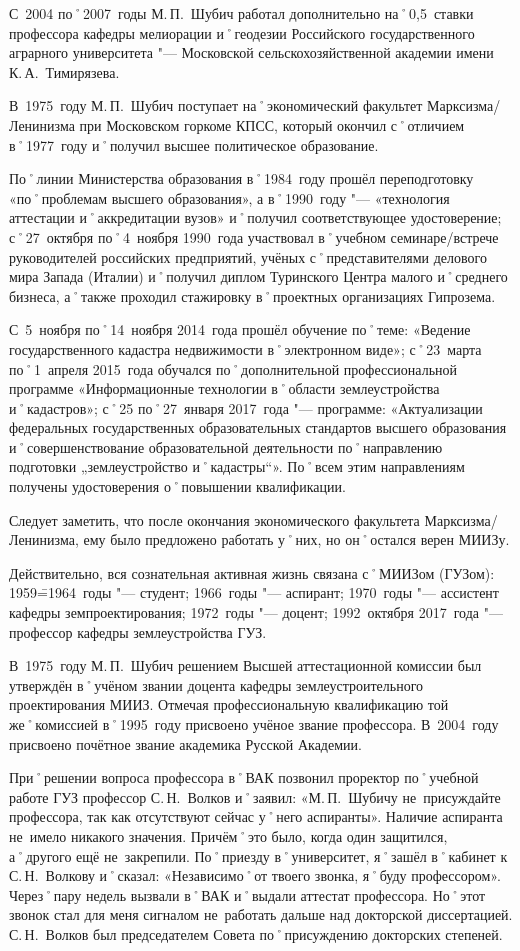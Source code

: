 С~2004 по˚2007~годы М.\,П.~Шубич работал дополнительно на˚0,5~ставки профессора кафедры мелиорации и˚геодезии Российского государственного аграрного университета "--- Московской сельскохозяйственной академии имени К.\,А.~Тимирязева.

В~1975~году М.\,П.~Шубич поступает на˚экономический факультет Марксизма\-/Ленинизма при Московском горкоме КПСС, который окончил с˚отличием в˚1977~году и˚получил высшее политическое образование.

По˚линии Министерства образования в˚1984~году прошёл переподготовку «по˚проблемам высшего образования», а в˚1990~году "--- «технология аттестации и˚аккредитации вузов» и˚получил соответствующее удостоверение; с˚27~октября по˚4~ноября 1990~года участвовал в˚учебном семинаре\-/встрече руководителей российских предприятий, учёных с˚представителями делового мира Запада (Италии) и˚получил диплом Туринского Центра малого и˚среднего бизнеса, а˚также проходил стажировку в˚проектных организациях Гипрозема.

С~5~ноября по˚14~ноября 2014~года прошёл обучение по˚теме: «Ведение государственного кадастра недвижимости в˚электронном виде»; с˚23~марта по˚1~апреля 2015~года обучался по˚дополнительной профессиональной программе «Информационные технологии в˚области землеустройства и˚кадастров»; с˚25 по˚27~января 2017~года "--- программе: «Актуализации федеральных государственных образовательных стандартов высшего образования и˚совершенствование образовательной деятельности по˚направлению подготовки „землеустройство и˚кадастры“». По˚всем этим направлениям получены удостоверения о˚повышении квалификации. 

Следует заметить, что после окончания экономического факультета Марксизма\-/Ленинизма, ему было предложено работать у˚них, но он˚остался верен МИИЗу.

Действительно, вся сознательная активная жизнь связана с˚МИИЗом (ГУЗом): 1959\==1964~годы "--- студент; 1966~годы "--- аспирант; 1970~годы "--- ассистент кафедры земпроектирования; 1972~годы "--- доцент; 1992~октября 2017~года "--- профессор кафедры землеустройства ГУЗ.

В~1975~году М.\,П.~Шубич решением Высшей аттестационной комиссии был утверждён в˚учёном звании доцента кафедры землеустроительного проектирования МИИЗ. Отмечая профессиональную квалификацию той же˚комиссией в˚1995~году присвоено учёное звание профессора. В~2004~году присвоено почётное звание академика Русской Академии.

При˚решении вопроса профессора в˚ВАК позвонил проректор по˚учебной работе ГУЗ профессор С.\,Н.~Волков и˚заявил: «М.\,П.~Шубичу не~присуждайте профессора, так как отсутствуют сейчас у˚него аспиранты». Наличие аспиранта не~имело никакого значения. Причём˚это было, когда один защитился, а˚другого ещё не~закрепили. По˚приезду в˚университет, я˚зашёл в˚кабинет к С.\,Н.~Волкову и˚сказал: «Независимо˚от твоего звонка, я˚буду профессором». Через˚пару недель вызвали в˚ВАК и˚выдали аттестат профессора. Но˚этот звонок стал для меня сигналом не~работать дальше над докторской диссертацией. С.\,Н.~Волков был председателем Совета по˚присуждению докторских степеней.

